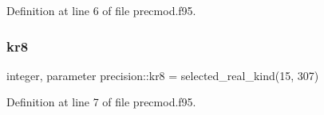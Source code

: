 Definition at line 6 of file precmod.\+f95.

\mbox{\label{namespaceprecision_a4b30cd5919aba1303b7b752110b57254}} 
\subsubsection{\texorpdfstring{kr8}{kr8}}
{\footnotesize\ttfamily integer, parameter precision\+::kr8 = selected\+\_\+real\+\_\+kind(15, 307)}



Definition at line 7 of file precmod.\+f95.

